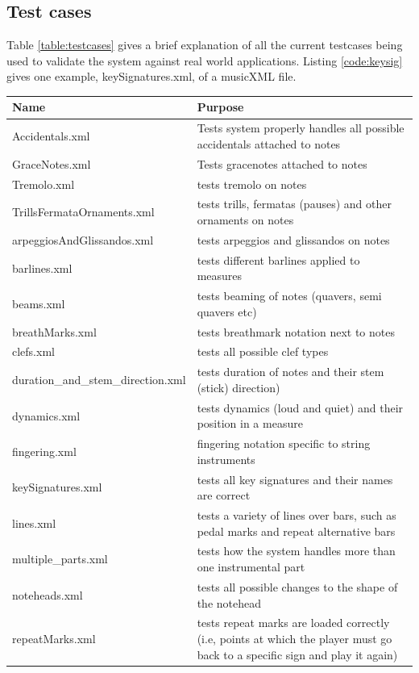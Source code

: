\begin{appendices}
\section{Test cases}
Table \ref{table:testcases} gives a brief explanation of all the current testcases being used to validate the system against real world applications. Listing \ref{code:keysig} gives one example, keySignatures.xml, of a musicXML file.
\begin{table}[H]
\centering
\begin{tabu}to 1.0\textwidth{| X[l] | X[l] |} \hline
{Name} & {Purpose} \\ \hline	
Accidentals.xml & Tests system properly handles all possible accidentals attached to notes \\ \hline
GraceNotes.xml & Tests gracenotes attached to notes \\ \hline
Tremolo.xml & tests tremolo on notes \\ \hline
TrillsFermataOrnaments.xml & tests trills, fermatas (pauses) and other ornaments on notes \\ \hline
arpeggiosAndGlissandos.xml & tests arpeggios and glissandos on notes \\ \hline
barlines.xml & tests different barlines applied to measures \\ \hline
beams.xml & tests beaming of notes (quavers, semi quavers etc) \\ \hline
breathMarks.xml & tests breathmark notation next to notes \\ \hline
clefs.xml & tests all possible clef types \\ \hline
duration\_and\_stem\_direction.xml & tests duration of notes and their stem (stick) direction) \\ \hline
dynamics.xml & tests dynamics (loud and quiet) and their position in a measure \\ \hline
fingering.xml & fingering notation specific to string instruments \\ \hline
keySignatures.xml & tests all key signatures and their names are correct \\ \hline
lines.xml & tests a variety of lines over bars, such as pedal marks and repeat alternative bars \\ \hline
multiple\_parts.xml & tests how the system handles more than one instrumental part \\ \hline
noteheads.xml & tests all possible changes to the shape of the notehead \\ \hline
repeatMarks.xml & tests repeat marks are loaded correctly (i.e, points at which the player must go back to a specific sign and play it again) \\ \hline

\end{tabu}
\end{table}
\end{appendices}

